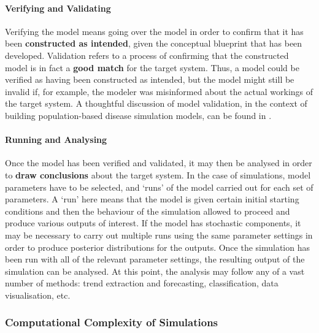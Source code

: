 \paragraph{Verifying and Validating}

Verifying the model means going over the model in order to confirm that it has been \textbf{constructed as intended}, given the conceptual blueprint that has been developed. Validation refers to a process of confirming that the constructed model is in fact a \textbf{good match} for the target system. Thus, a model could be verified as having been constructed as intended, but the model might still be invalid if, for example, the modeler was misinformed about the actual workings of the target system. A thoughtful discussion of model validation, in the context of building population-based disease simulation models, can be found in \cite{SIM_KFMBF}.

\paragraph{Running and Analysing}

Once the model has been verified and validated, it may then be analysed in order to \textbf{draw conclusions} about the target system. In the case of simulations, model parameters have to be selected, and `runs' of the model carried out for each set of parameters. A `run' here means that the model is given certain initial starting conditions and then the behaviour of the simulation allowed to proceed and produce various outputs of interest. If the model has stochastic components, it may be necessary to carry out multiple runs using the same parameter settings in order to produce posterior distributions for the outputs. Once the simulation has been run with all of the relevant parameter settings, the resulting output of the simulation can be analysed. At this point, the analysis may follow any of a vast number of methods: trend extraction and forecasting, classification, data visualisation, etc. 


\subsubsection{Computational Complexity of Simulations}

